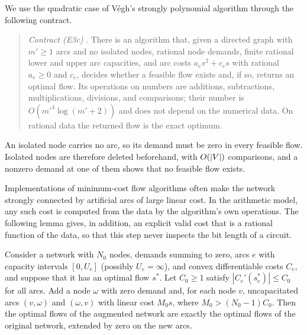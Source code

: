 We use the quadratic case of V\'egh's strongly polynomial algorithm through
the following contract.

\begin{quote}
\emph{Contract (E3c)} \citep[Theorem~20 and Section~6.1]{Vegh2016}. There is
an algorithm that, given a directed graph with $m'\ge1$ arcs and no isolated
nodes, rational node demands, finite rational lower and upper arc capacities,
and arc costs $a_es^2+c_es$ with rational $a_e\ge0$ and $c_e$, decides whether
a feasible flow exists and, if so, returns an optimal flow. Its operations on
numbers are additions, subtractions, multiplications, divisions, and
comparisons; their number is $O(m'^4\log(m'+2))$ and does not depend on the
numerical data. On rational data the returned flow is the exact optimum.
\end{quote}

An isolated node carries no arc, so its demand must be zero in every feasible
flow. Isolated nodes are therefore deleted beforehand, with $O(\left\lvert V\right\rvert)$
comparisons, and a nonzero demand at one of them shows that no feasible flow
exists.

Implementations of minimum-cost flow algorithms often make the network
strongly connected by artificial arcs of large linear cost. In the arithmetic
model, any such cost is computed from the data by the algorithm's own
operations. The following lemma gives, in addition, an explicit valid cost
that is a rational function of the data, so that this step never inspects the
bit length of a circuit.

\begin{lemma}
\label{lem:constraints-artificial}
Consider a network with $N_0$ nodes, demands summing to zero, arcs $e$ with
capacity intervals $[0,U_e]$ (possibly $U_e=\infty$), and convex differentiable
costs $C_e$, and suppose that it has an optimal flow $s^*$. Let $C_0\ge1$ satisfy
$|C_e'(s^*_e)|\le C_0$ for all arcs. Add a node $\omega$ with zero demand and,
for each node $v$, uncapacitated arcs $(v,\omega)$ and $(\omega,v)$ with
linear cost $M_0s$, where $M_0>(N_0-1)C_0$. Then the optimal flows of the
augmented network are exactly the optimal flows of the original network,
extended by zero on the new arcs.
\end{lemma}

